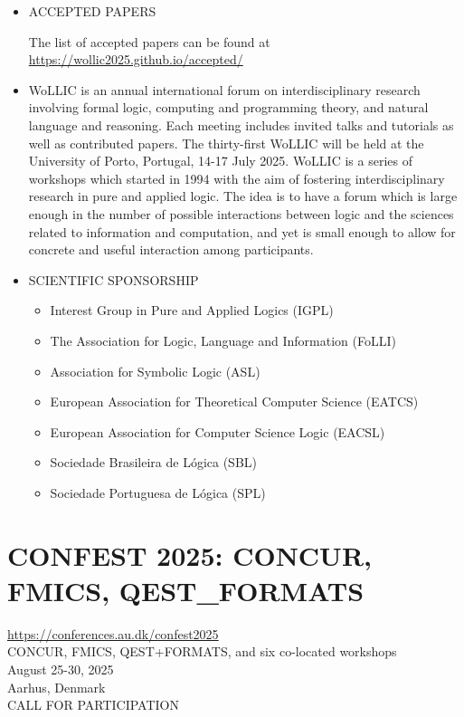 \documentclass[prodmode,acmtecs]{acmsmall} %
\begin{document}
{\begin{itemize}
\begin{itemize}\item  Tobias Kappé (Leiden University): On propositional program equivalence.
\item  Daniela Petrişan (IRIF, Université de Paris): Functorial Mealy machines.
\end{itemize} 
\item  ACCEPTED PAPERS 
 
  The list of accepted papers can be found at \href{https://wollic2025.github.io/accepted/}{https://wollic2025.github.io/accepted/} 
 
\item  WoLLIC is an annual international forum on interdisciplinary research involving formal logic, computing and programming theory, and natural language and reasoning. Each meeting includes invited talks and tutorials as well as contributed papers. The thirty-first WoLLIC will be held at the University of Porto, Portugal, 14-17 July 2025. WoLLIC is a series of workshops which started in 1994 with the aim of fostering interdisciplinary research in pure and applied logic. The idea is to have a forum which is large enough in the number of possible interactions between logic and the sciences related to information and computation, and yet is small enough to allow for concrete and useful interaction among participants. 
 
\item  SCIENTIFIC SPONSORSHIP 
 
\begin{itemize}\item  Interest Group in Pure and Applied Logics (IGPL)
\item  The Association for Logic, Language and Information (FoLLI)
\item  Association for Symbolic Logic (ASL)
\item  European Association for Theoretical Computer Science (EATCS)
\item  European Association for Computer Science Logic (EACSL)
\item  Sociedade Brasileira de Lógica (SBL)
\item  Sociedade Portuguesa de Lógica (SPL)
\end{itemize} 
\end{itemize}\section{CONFEST 2025: CONCUR, FMICS, QEST\_FORMATS}\label{CONFEST2025}  \href{https://conferences.au.dk/confest2025}{https://conferences.au.dk/confest2025}\\ 
  CONCUR, FMICS, QEST+FORMATS, and six co-located workshops\\ 
  August 25-30, 2025\\ 
  Aarhus, Denmark\\ 
CALL FOR PARTICIPATION 

}
\end{document}

